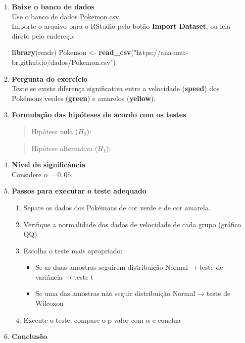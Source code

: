 \documentclass[
]{book}
\newenvironment{Shaded}{\begin{snugshade}}{\end{snugshade}}
\newcommand{\FunctionTok}[1]{\textcolor[rgb]{0.13,0.29,0.53}{\textbf{#1}}}
\newcommand{\NormalTok}[1]{#1}
\newcommand{\OtherTok}[1]{\textcolor[rgb]{0.56,0.35,0.01}{#1}}
\newcommand{\StringTok}[1]{\textcolor[rgb]{0.31,0.60,0.02}{#1}}
\providecommand{\tightlist}{%
  \setlength{\itemsep}{0pt}\setlength{\parskip}{0pt}}
\begin{document}
\begin{enumerate}
\def\labelenumi{\arabic{enumi}.}
\item
  \textbf{Baixe o banco de dados}\\
  Use o banco de dados \href{https://ana-mat-br.github.io/dados/Pokemon.csv}{Pokemon.csv}.\\
  Importe o arquivo para o RStudio pelo botão \textbf{Import Dataset}, ou leia direto pelo endereço:

\begin{Shaded}
\begin{Highlighting}[]
\FunctionTok{library}\NormalTok{(readr)}
\NormalTok{Pokemon }\OtherTok{\textless{}{-}} \FunctionTok{read\_csv}\NormalTok{(}\StringTok{"https://ana{-}mat{-}br.github.io/dados/Pokemon.csv"}\NormalTok{)}
\end{Highlighting}
\end{Shaded}
\item
  \textbf{Pergunta do exercício}\\
  Teste se existe diferença significativa entre a velocidade (\textbf{speed}) dos Pokémons verdes (\textbf{green}) e amarelos (\textbf{yellow}).
\item
  \textbf{Formulação das hipóteses de acordo com os testes}

  \begin{quote}
  Hipótese nula (\(H_0\)):
  \end{quote}

  \begin{quote}
  Hipótese alternativa (\(H_1\)):
  \end{quote}
\item
  \textbf{Nível de significância}\\
  Considere \(\alpha = 0,05\).
\item
  \textbf{Passos para executar o teste adequado}

  \begin{enumerate}
  \def\labelenumii{\alph{enumii})}
  \tightlist
  \item
    Separe os dados dos Pokémons de cor verde e de cor amarela.\\
  \item
    Verifique a normalidade dos dados de velocidade de cada grupo (gráfico QQ).\\
  \item
    Escolha o teste mais apropriado:

    \begin{itemize}
    \tightlist
    \item
      Se as duas amostras seguirem distribuição Normal → teste de variância → teste t
    \item
      Se uma das amostras não seguir distribuição Normal → teste de Wilcoxon
    \end{itemize}
  \item
    Execute o teste, compare o p-valor com \(\alpha\) e conclua
  \end{enumerate}
\item
  \textbf{Conclusão}


\end{enumerate}
\end{document}
